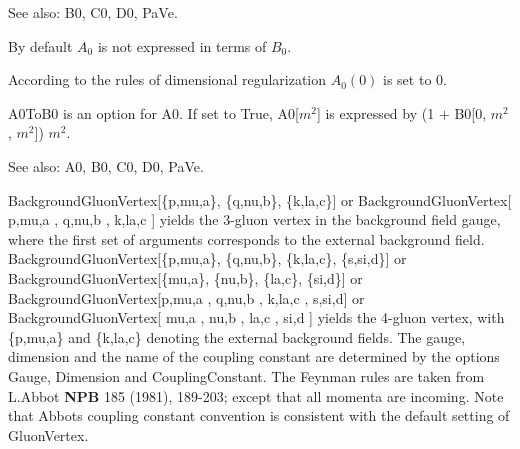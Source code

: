 

See also:  B0, C0, D0, PaVe.


By default \({A_0}\) is not expressed in terms of \({B_0}\).







According to the rules of dimensional regularization \({A_0}(0)\) is set to 0.







A0ToB0 is an option for A0. If set to True, A0[\({m^2}\)] is expressed by (1 \(+\) B0[0, \({m^2}\), \({m^2}\)]) \({m^2}\).



See also:  A0, B0, C0, D0, PaVe.



BackgroundGluonVertex[\{p,mu,a\}, \{q,nu,b\}, \{k,la,c\}] or BackgroundGluonVertex[ p,mu,a , q,nu,b , k,la,c ] yields the 3-gluon vertex
  in the background field gauge, where the first set of arguments corresponds to the external background field.
  BackgroundGluonVertex[\{p,mu,a\}, \{q,nu,b\}, \{k,la,c\}, \{s,si,d\}] or BackgroundGluonVertex[\{mu,a\}, \{nu,b\}, \{la,c\}, \{si,d\}] or BackgroundGluonVertex[p,mu,a
, q,nu,b , k,la,c , s,si,d] or BackgroundGluonVertex[ mu,a , nu,b , la,c , si,d ] yields the
  4-gluon vertex, with \{p,mu,a\} and \{k,la,c\} denoting the external background fields. The gauge, dimension and the name of the
  coupling constant are determined by the options Gauge, Dimension and CouplingConstant. The Feynman rules are taken from L.Abbot {\bfseries NPB
}185 (1981), 189-203; except that all momenta are incoming. Note that Abbots coupling constant convention is consistent with the default
  setting of GluonVertex.

